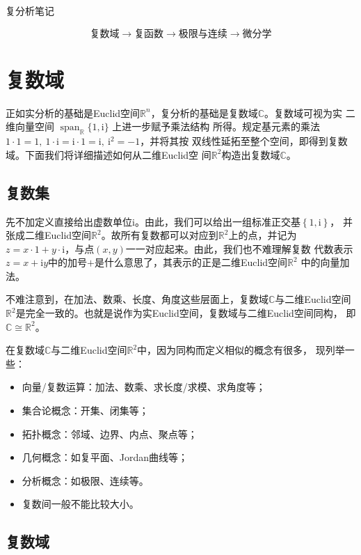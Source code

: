 \documentclass[UTF8,fontset=fandol,zihao=5]{ctexart}
\newcommand{\ii}{\mathrm{i}}
\newcommand{\CC}{\mathbb{C}}
\newcommand{\RR}{\mathbb{R}}
\begin{document}
\begin{center}
  {\heiti\headingfont{}\color{main} 复分析笔记}
\end{center}

\begin{relationbox}
\[
  \boxed{\text{复数域}}
  \longrightarrow
  \boxed{\text{复函数}}
  \longrightarrow
  \boxed{\text{极限与连续}}
  \longrightarrow
  \boxed{\text{微分学}}
\]
\end{relationbox}

\section{复数域}
正如实分析的基础是Euclid空间$\RR^n$，复分析的基础是复数域$\CC$。复数域可视为实
二维向量空间 \(\operatorname{span}_{\mathbb R}\{1,\ii\}\) 上进一步赋予乘法结构
所得。规定基元素的乘法 \(1 \cdot 1=1,\ 1 \cdot \ii=\ii \cdot 1=\ii,\ \ii^2=-1\)，并将其按
双线性延拓至整个空间，即得到复数域。下面我们将详细描述如何从二维Euclid空
间$\RR^2$构造出复数域$\CC$。


\subsection{复数集}
先不加定义直接给出虚数单位$\ii$。由此，我们可以给出一组标准正交基$\left \{1, \ii\right \}$，
并张成二维Euclid空间$\RR^2$。故所有复数都可以对应到$\RR^2$上的点，并记为
$z=x \cdot 1 + y \cdot \ii$，与点$(x,y)$一一对应起来。由此，我们也不难理解复数
代数表示$z=x+\ii y$中的加号$+$是什么意思了，其表示的正是二维Euclid空间$\RR^2$
中的向量加法。

不难注意到，在加法、数乘、长度、角度这些层面上，复数域$\CC$与二维Euclid空间
$\RR^2$是完全一致的。也就是说作为实Euclid空间，复数域与二维Euclid空间同构，
即$\CC \cong \RR^2$。

在复数域$\CC$与二维Euclid空间$\RR^2$中，因为同构而定义相似的概念有很多，
现列举一些：
\begin{itemize}
  \item 向量/复数运算：加法、数乘、求长度/求模、求角度等；
  \item 集合论概念：开集、闭集等；
  \item 拓扑概念：邻域、边界、内点、聚点等；
  \item 几何概念：如复平面、Jordan曲线等；
  \item 分析概念：如极限、连续等。
  \item 复数间一般不能比较大小。
\end{itemize}

\subsection{复数域}
\end{document}
